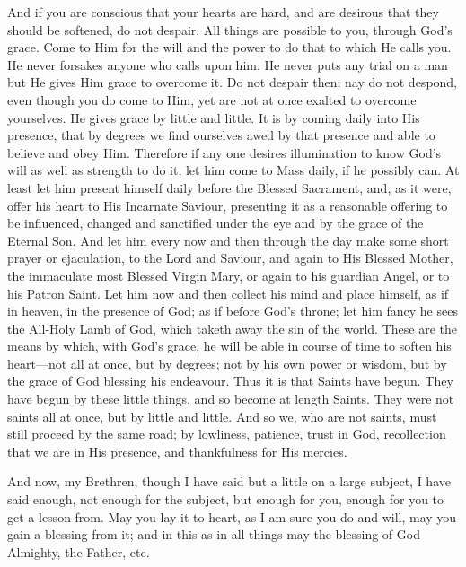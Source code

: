 And if you are conscious that your hearts are
hard, and are desirous that they should be softened, do not despair.
All things are possible to you, through God's grace. Come to Him for
the will and the power to do that to which He calls you. He never
forsakes anyone who calls upon him. He never puts any trial on a man
but He gives Him grace to overcome it. Do not despair then; nay do not
despond, even though you do come to Him, yet are not at once exalted
to overcome yourselves. He gives grace by little and little. It is by
coming daily into His presence, that by degrees we find ourselves awed
by that presence and able to believe and obey Him. Therefore if any
one desires illumination to know God's will as well as strength to do
it, let him come to Mass daily, if he possibly can. At least let him
present himself daily before the Blessed Sacrament, and, as it were,
offer his heart to His Incarnate Saviour, presenting it as a
reasonable offering to be influenced, changed and sanctified under the
eye and by the grace of the Eternal Son. And let him every now and
then through the day make some short prayer or ejaculation, to
the Lord and Saviour, and again to His Blessed Mother, the immaculate
most Blessed Virgin Mary, or again to his guardian Angel, or to his
Patron Saint. Let him now and then collect his mind and place himself,
as if in heaven, in the presence of God; as if before God's throne;
let him fancy he sees the All-Holy Lamb of God, which taketh away the
sin of the world. These are the means by which, with God's grace, he
will be able in course of time to soften his heart—not all at once,
but by degrees; not by his own power or wisdom, but by the grace of
God blessing his endeavour. Thus it is that Saints have begun. They
have begun by these little things, and so become at length Saints.
They were not saints all at once, but by little and little. And so we,
who are not saints, must still proceed by the same road; by lowliness,
patience, trust in God, recollection that we are in His presence, and
thankfulness for His mercies.

And now, my Brethren, though I have said but a
little on a large subject, I have said enough, not enough for the
subject, but enough for you, enough for you to get a lesson from. May
you lay it to heart, as I am sure you do and will, may you gain a
blessing from it; and in this as in all things may the blessing of God
Almighty, the Father, etc.



